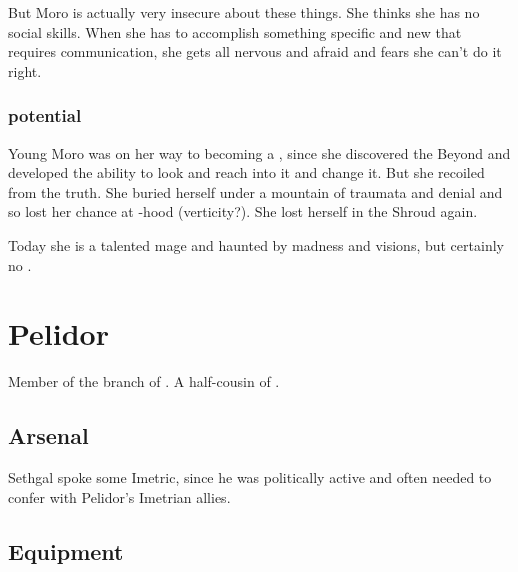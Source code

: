 But Moro is actually very insecure about these things. 
She thinks she has no social skills. 
When she has to accomplish something specific and new that requires communication, she gets all nervous and afraid and fears she can't do it right. 





\subsubsection{\Vertex{} potential}
Young Moro was on her way to becoming a \vertex, since she discovered the Beyond and developed the ability to look and reach into it and change it. 
But she recoiled from the truth. 
She buried herself under a mountain of traumata and denial and so lost her chance at \vertex-hood (verticity?). 
She lost herself in the Shroud again. 

Today she is a talented mage and haunted by madness and visions, but certainly no \vertex. 















\section[Sethgal Pelidor]{ Pelidor}
Member of the \Malcuric{} branch of . 
A half-cousin of . 









\subsection{Arsenal}
Sethgal spoke some Imetric, since he was politically active and often needed to confer with Pelidor's Imetrian allies. 









\subsection{Equipment}





